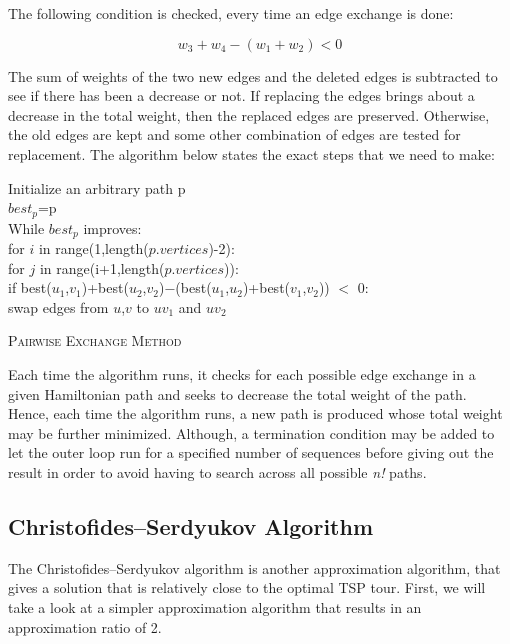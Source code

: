 \documentclass[12pt]{report}
\begin{document}
    The following condition is checked, every time an edge exchange is done:
    
    \[w_{3}+w_{4} - (w_{1} +w_{2})<0\]
    
    The sum of weights of the two new edges and the deleted edges is subtracted to see if there has been a decrease or not. If replacing the edges brings about a decrease in the total weight, then the replaced edges are preserved. Otherwise, the old edges are kept and some other combination of edges are tested for replacement. The algorithm below states the exact steps that we need to make:\\
    
    \begin{algorithm*}
        Initialize an arbitrary path p \\
        $best_p$=p \\
        While $best_p$ improves: \\
        for $i$ in range(1,length($p.vertices$)-2): \\
        \quad for $j$ in range(i+1,length($p.vertices$)):\\
        \qquad if best($u_{1}$,$v_{1}$)+best($u_{2}$,$v_{2}$)$-$(best($u_{1}$,$u_{2}$)+best($v_{1}$,$v_{2}$)) $<$ 0:\\
        swap edges from $u$,$v$ to $uv_{1}$ and $uv_{2}$\\
    \caption{\textsc{Pairwise Exchange Method}}
    \end{algorithm*}        
    
    Each time the algorithm runs, it checks for each possible edge exchange in a given Hamiltonian path and seeks to decrease the total weight of the path. Hence, each time the algorithm runs, a new path is produced whose total weight may be further minimized. Although, a termination condition may be added to let the outer loop run for a specified number of sequences before giving out the result in order to avoid having to search across all possible \textit{n!} paths.

    \subsection{Christofides–Serdyukov Algorithm}
    The Christofides–Serdyukov algorithm is another approximation algorithm, that gives a solution that is relatively close to the optimal TSP tour. First, we will take a look at a simpler approximation algorithm that results in an approximation ratio of 2.
\end{document}
